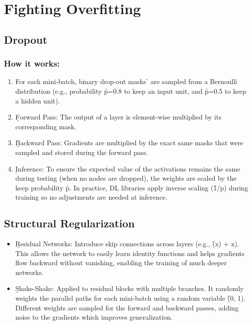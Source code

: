 \section{Fighting Overfitting}

\subsection{Dropout}


\subsubsection{How it works:}
\begin{enumerate}
\item For each mini-batch, binary drop-out masks \f{\mu} are sampled from a Bernoulli distribution (e.g., probability \f{p=0.8} to keep an input unit, and \f{p=0.5} to keep a hidden unit).
\item \b{Forward Pass}: The output of a layer is element-wise multiplied by its corresponding mask.
\item \b{Backward Pass}: Gradients are multiplied by the exact same masks that were sampled and stored during the forward pass.
\item \b{Inference}: To ensure the expected value of the activations remains the same during testing (when no nodes are dropped), the weights are scaled by the keep probability \f{p}. In practice, DL libraries apply inverse scaling (\f{1/p}) during training so no adjustments are needed at inference.
\end{enumerate}






\subsection{Structural Regularization}

\begin{itemize}
\item \b{Residual Networks}: Introduce skip connections across layers (e.g., \f{(x) + x}). This allows the network to easily learn identity functions and helps gradients flow backward without vanishing, enabling the training of much deeper networks.
\item \b{Shake-Shake}: Applied to residual blocks with multiple branches. It randomly weights the parallel paths for each mini-batch using a random variable \f{\alpha \in {}(0, 1)}. Different weights are sampled for the forward and backward passes, adding noise to the gradients which improves generalization.
\end{itemize}







